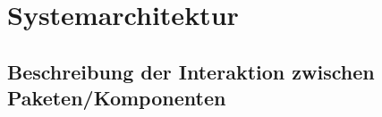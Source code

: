 \section{Systemarchitektur}
\subsection{Beschreibung der Interaktion zwischen Paketen/Komponenten}

